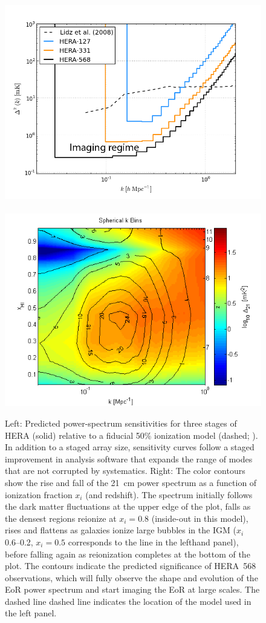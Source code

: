 \documentclass[preprint]{aastex}
\begin{document}
\begin{figure}[t]\centering
\includegraphics[width=3.1 in]{plots/eor_pspec.png}
~ %
\includegraphics[width=3.1 in]{plots/hera_snr_contour.png}
\caption{\small
Left: Predicted power-spectrum sensitivities for three stages of
HERA (solid) relative to a fiducial 50\% ionization model 
(dashed; \citealt{lidz_et_al2008}).  In addition
to a staged array size, sensitivity curves follow
a staged improvement in analysis software that expands the range
of modes that are not corrupted by systematics. 
Right: 
The color contours show the rise and fall of the 21~cm power spectrum 
\citep{lidz_et_al2008} as a function of  ionization fraction $x_i$ (and redshift). The spectrum initially follows the dark matter fluctuations at the upper edge of the plot, falls as the densest regions reionize at $x_i=0.8$ (inside-out in this model), rises and flattens as galaxies ionize large bubbles in the IGM ($x_i$ 0.6--0.2, $x_i=0.5$ corresponds to the line in the lefthand panel), before falling again as reionization completes at the bottom of the plot. The contours indicate the predicted significance of HERA~568 observations, which will fully observe the shape and evolution of the EoR power spectrum and start imaging the EoR at large scales.
The dashed line dashed line indicates the location
of the model used in the left panel.
}\label{fig:eor_pspec}
\end{figure}
\end{document}
